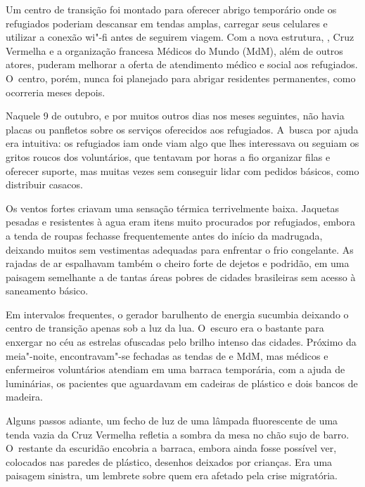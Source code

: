 Um centro de transição foi montado para oferecer abrigo temporário onde
os refugiados poderiam descansar em tendas amplas, carregar
seus celulares e utilizar a conexão wi"-fi antes de seguirem viagem. Com
a nova estrutura, , Cruz Vermelha e a organização francesa Médicos do
Mundo (MdM), além de outros atores, puderam melhorar a oferta de
atendimento médico e social aos refugiados. O~centro, porém, nunca foi
planejado para abrigar residentes permanentes, como ocorreria meses
depois.

Naquele 9 de outubro, e por muitos outros dias nos meses seguintes, não
havia placas ou panfletos sobre os serviços oferecidos aos refugiados. A~busca por ajuda era intuitiva: os refugiados iam onde viam algo que lhes
interessava ou seguiam os gritos roucos dos voluntários, que tentavam
por horas a fio organizar filas e oferecer suporte, mas muitas vezes sem
conseguir lidar com pedidos básicos, como distribuir casacos.

Os ventos fortes criavam uma sensação térmica terrivelmente baixa.
Jaquetas pesadas e resistentes à agua eram itens muito procurados por
refugiados, embora a tenda de roupas fechasse frequentemente antes do
início da madrugada, deixando muitos sem vestimentas adequadas para
enfrentar o frio congelante. As rajadas de ar espalhavam também o cheiro
forte de dejetos e podridão, em uma paisagem semelhante a de tantas
áreas pobres de cidades brasileiras sem acesso à saneamento básico.

Em intervalos frequentes, o gerador barulhento de energia sucumbia
deixando o centro de transição apenas sob a luz da lua. O~escuro era o
bastante para enxergar no céu as estrelas ofuscadas pelo brilho intenso
das cidades. Próximo da meia"-noite, encontravam"-se fechadas as tendas de
 e MdM, mas médicos e enfermeiros voluntários atendiam em uma barraca
temporária, com a ajuda de  luminárias, os pacientes que
aguardavam em cadeiras de plástico e dois bancos de madeira.

Alguns passos adiante, um fecho de luz de uma lâmpada fluorescente de uma tenda vazia da Cruz Vermelha refletia a sombra da mesa no chão sujo de barro. O~restante da escuridão encobria a barraca, embora ainda
fosse possível ver, colocados nas paredes de plástico, desenhos deixados
por crianças. Era uma paisagem sinistra, um lembrete sobre
quem era afetado pela crise migratória.



